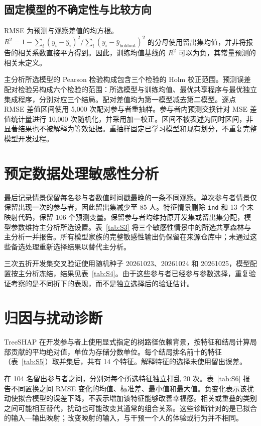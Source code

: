 \clearpage



\subsection{固定模型的不确定性与比较方向}
RMSE 为预测与观察差值的均方根。$R^2=1-\sum_i(y_i-\hat y_i)^2/\sum_i(y_i-\bar y_{\mathrm{holdout}})^2$ 的分母使用留出集均值，并非将报告的相关系数直接平方得到。因此，训练均值基线的 $R^2$ 可以为负，其常量预测的相关未定义。

主分析所选模型的 Pearson 检验构成包含三个检验的 Holm 校正范围。预测误差配对检验另构成六个检验的范围：所选模型与训练均值、最优共享程序与最优独立集成程序，分别对应三个结局。配对差值均为第一模型减去第二模型。逐点 RMSE 差值区间使用 5,000 次配对参与者重抽样。参与者内预测交换针对 MSE 差值统计量进行 10,000 次随机化，并采用加一校正。区间不被表述为同时区间，非显著结果也不被解释为等效证据。重抽样固定已学习模型和现有划分，不重复完整模型开发过程。

\section{预定数据处理敏感性分析}
最后记录情景保留每名参与者数值时间戳最晚的一条不同观察。单次参与者情景仅保留出现一次的参与者，因此留出集减少至 85 人。特征情景删除 \texttt{ind} 和 13 个未映射代码，保留 106 个预测变量。保留参与者均维持原开发集或留出集分配，模型参数维持主分析所选设置。表~\ref{tab:S3} 将三个敏感性情景中的所选共享森林与主分析一并报告。所有模型家族的完整敏感性输出仍保留在来源仓库中；未通过这些备选处理重新选择结果以替代主分析。



三次五折开发集交叉验证使用随机种子 20261023、20261024 和 20261025，模型配置按主分析冻结，结果见表~\ref{tab:S4}。由于这些参与者已经参与参数选择，重复验证考察的是不同折下的表现，而不是独立选择后的验证估计。



\section{归因与扰动诊断}
TreeSHAP 在开发参与者上使用显式指定的树路径依赖背景，按特征和结局计算局部贡献的平均绝对值，单位为存储分数单位\citep{lundberg2020}。每个结局排名前十的特征（表~\ref{tab:S5}）取并集后，共有 14 个特征。解释特征的选择未使用留出误差。



在 104 名留出参与者之间，分别对每个所选特征独立打乱 20 次。表~\ref{tab:S6} 报告不同置换之间 RMSE 变化的均值、标准差、最小值和最大值。负变化表示该扰动使拟合模型的误差下降，不表示增加该特征能够改善幸福感。相关或重叠的类别之间可能相互替代，扰动也可能改变其通常的组合关系。这些诊断针对的是已拟合的输入—输出映射；改变映射的输入，与干预一个人的体验或行为并不相同\citep{janzing2020}。

